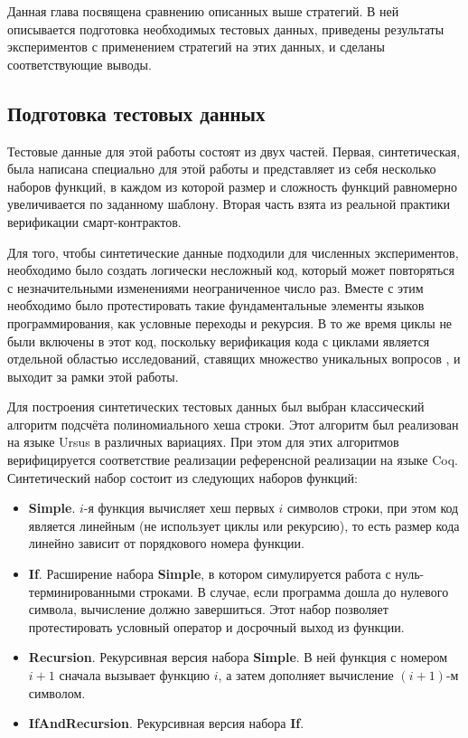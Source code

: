 \documentclass[../diploma.tex]{subfiles}
\begin{document}
\label{sec:3}

Данная глава посвящена сравнению описанных выше стратегий. В ней описывается подготовка необходимых тестовых данных, приведены результаты экспериментов с применением стратегий на этих данных, и сделаны соответствующие выводы.

\subsection{Подготовка тестовых данных}\label{dataset}

Тестовые данные для этой работы состоят из двух частей. Первая, синтетическая, была написана специально для этой работы и представляет из себя несколько наборов функций, в каждом из которой размер и сложность функций равномерно увеличивается по заданному шаблону. Вторая часть взята из реальной практики верификации смарт-контрактов.

Для того, чтобы синтетические данные подходили для численных экспериментов, необходимо было создать логически несложный код, который может повторяться с незначительными изменениями неограниченное число раз. Вместе с этим необходимо было протестировать такие фундаментальные элементы языков программирования, как условные переходы и рекурсия. В то же время циклы не были включены в этот код, поскольку верификация кода с циклами является отдельной областью исследований, ставящих множество уникальных вопросов \cite{loops_are_hard}, и выходит за рамки этой работы.

Для построения синтетических тестовых данных был выбран классический алгоритм подсчёта полиномиального хеша строки. Этот алгоритм был реализован на языке Ursus в различных вариациях. При этом для этих алгоритмов верифицируется соответствие реализации референсной реализации на языке Coq. Синтетический набор состоит из следующих наборов функций:

\begin{itemize}
    \item \textbf{Simple}. $i$-я функция вычисляет хеш первых $i$ символов строки, при этом код является линейным (не использует циклы или рекурсию), то есть размер кода линейно зависит от порядкового номера функции.
    \item \textbf{If}. Расширение набора \textbf{Simple}, в котором симулируется работа с нуль-\\ терминированными строками. В случае, если программа дошла до нулевого символа, вычисление должно завершиться. Этот набор позволяет протестировать условный оператор и досрочный выход из функции.
    \item \textbf{Recursion}. Рекурсивная версия набора \textbf{Simple}. В ней функция с номером $i+1$ сначала вызывает функцию $i$, а затем дополняет вычисление $(i+1)$-м символом.
    \item \textbf{IfAndRecursion}. Рекурсивная версия набора \textbf{If}.
\end{itemize}
\end{document}
